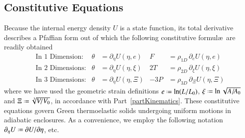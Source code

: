 \subsection{Constitutive Equations}

Because the internal energy density $U$ is a state function, its total derivative describes a Pfaffian form \cite{Caratheodory09} out of which the following constitutive formul\ae\ are readily obtained
\begin{subequations}
    \label{GreenElasticCEs}
    \begin{align}
    \mbox{} & \text{In 1 Dimension:} & 
    \theta & = \partial_{\eta} U ( \eta , e) &
    F & = \rho_{1D} \, \partial_{e} U ( \eta , e) \\
    \mbox{} & \text{In 2 Dimensions:} &
    \theta & = \partial_{\eta} U ( \eta , \xi) &
    2T & = \rho_{2D} \, \partial_{\xi} U ( \eta , \xi) \\
    \mbox{} & \text{In 3 Dimensions:} &
    \theta & = \partial_{\eta} U ( \eta ,  \Xi) &
    -3P & = \rho_{3D} \, \partial_{\Xi} U ( \eta ,  \Xi)
    \end{align}
\end{subequations}
where we have used the geometric strain definitions $e \defeq \ln ( L / L_0 )$, $\xi \defeq \ln \sqrt{ A / \! A_0 }$ and $\Xi \defeq \sqrt[3]{V \! / V_0}$, in accordance with Part~\ref{partKinematics}. These constitutive equations govern Green thermo\-elastic solids undergoing uniform motions in adiabatic enclosures.  As a convenience, we employ the following notation $\partial_{\eta} U \defeq \partial U / \partial \eta$, etc.

